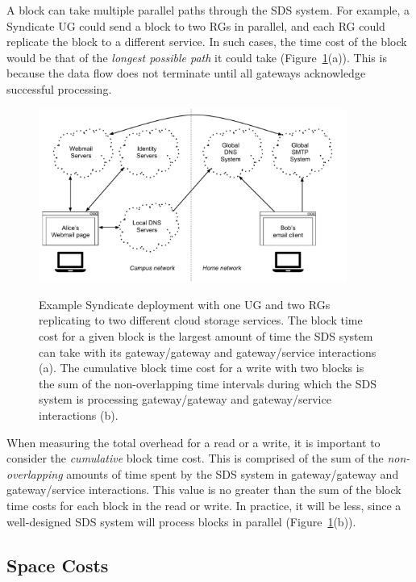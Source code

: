 A block can take multiple parallel paths through the SDS system.  For example, a
Syndicate UG could send a block to two RGs in parallel, and each RG could
replicate the block to a different service.  In such cases, 
the time cost of the block would be that of the \emph{longest possible path}
it could take (Figure~\ref{fig:evaluation-block-time-overview}(a)).
This is because the data flow does not terminate until all gateways
acknowledge successful processing.

\begin{figure}[h]
   \caption{Example Syndicate deployment with one UG and two RGs replicating to
two different cloud storage services.  The block time cost for a given block is
the largest amount of time the SDS system can take with its gateway/gateway and
gateway/service interactions (a).  The cumulative block time cost for a write
with two blocks is the sum of the non-overlapping time intervals during which
the SDS system is processing gateway/gateway and gateway/service interactions
(b).}
   \centering
   \includegraphics[width=0.9\textwidth,page=31]{figures/dissertation-figures}
   \label{fig:evaluation-block-time-overview}
\end{figure}

When measuring the total overhead for a read or a write, it is important
to consider the \emph{cumulative} block time cost.  This is comprised of the sum
of the \emph{non-overlapping} amounts of time spent by the SDS system in
gateway/gateway and gateway/service interactions.  This value is no greater than
the sum of the block time costs for each block in the read or write.  In
practice, it will be less, since a well-designed SDS system will process blocks
in parallel (Figure~\ref{fig:evaluation-block-time-overview}(b)).

\subsection{Space Costs}

